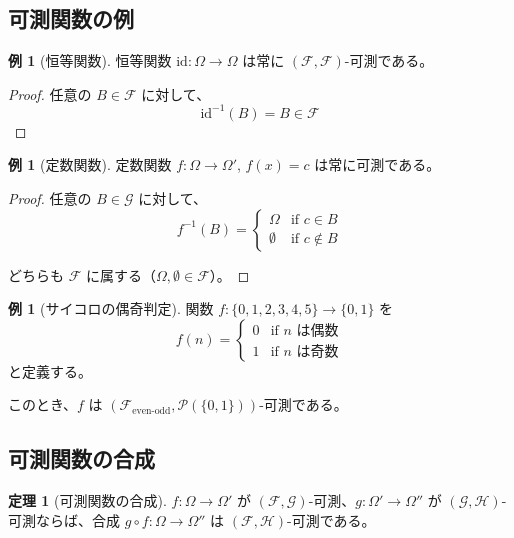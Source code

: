 \documentclass[12pt,a4paper,ja=standard]{bxjsarticle}
\theoremstyle{definition}
\newtheorem{theorem}[definition]{定理}
\newtheorem{example}[definition]{例}
\begin{document}
\subsection{可測関数の例}

\begin{example}[恒等関数]
恒等関数 $\mathrm{id} : \Omega \to \Omega$ は常に $(\mathcal{F}, \mathcal{F})$-可測である。

\begin{proof}
任意の $B \in \mathcal{F}$ に対して、
\[
\mathrm{id}^{-1}(B) = B \in \mathcal{F}
\]
\end{proof}
\end{example}

\begin{example}[定数関数]
定数関数 $f : \Omega \to \Omega'$, $f(x) = c$ は常に可測である。

\begin{proof}
任意の $B \in \mathcal{G}$ に対して、
\[
f^{-1}(B) = \begin{cases}
\Omega & \text{if } c \in B \\
\emptyset & \text{if } c \notin B
\end{cases}
\]

どちらも $\mathcal{F}$ に属する（$\Omega, \emptyset \in \mathcal{F}$）。
\end{proof}
\end{example}

\begin{example}[サイコロの偶奇判定]
関数 $f : \{0,1,2,3,4,5\} \to \{0,1\}$ を
\[
f(n) = \begin{cases}
0 & \text{if } n \text{ は偶数} \\
1 & \text{if } n \text{ は奇数}
\end{cases}
\]
と定義する。

このとき、$f$ は $(\mathcal{F}_{\text{even-odd}}, \mathcal{P}(\{0,1\}))$-可測である。
\end{example}

\subsection{可測関数の合成}

\begin{theorem}[可測関数の合成]
$f : \Omega \to \Omega'$ が $(\mathcal{F}, \mathcal{G})$-可測、$g : \Omega' \to \Omega''$ が $(\mathcal{G}, \mathcal{H})$-可測ならば、合成 $g \circ f : \Omega \to \Omega''$ は $(\mathcal{F}, \mathcal{H})$-可測である。
\end{theorem}
\end{document}
